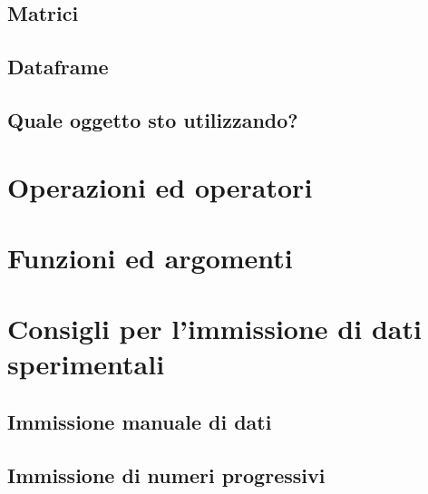 \documentclass[a4paper,12pt,oneside]{book}
\begin{document}
\hypertarget{matrici}{%
\subsection*{Matrici}\label{matrici}}

\hypertarget{dataframe}{%
\subsection*{Dataframe}\label{dataframe}}

\hypertarget{quale-oggetto-sto-utilizzando}{%
\subsection*{Quale oggetto sto utilizzando?}\label{quale-oggetto-sto-utilizzando}}

\hypertarget{operazioni-ed-operatori}{%
\section*{Operazioni ed operatori}\label{operazioni-ed-operatori}}

\hypertarget{funzioni-ed-argomenti}{%
\section*{Funzioni ed argomenti}\label{funzioni-ed-argomenti}}

\hypertarget{consigli-per-limmissione-di-dati-sperimentali}{%
\section*{Consigli per l'immissione di dati sperimentali}\label{consigli-per-limmissione-di-dati-sperimentali}}

\hypertarget{immissione-manuale-di-dati}{%
\subsection*{Immissione manuale di dati}\label{immissione-manuale-di-dati}}

\hypertarget{immissione-di-numeri-progressivi}{%
\subsection*{Immissione di numeri progressivi}\label{immissione-di-numeri-progressivi}}
\end{document}
